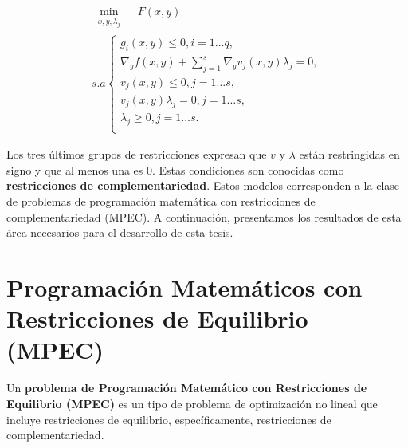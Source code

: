 % 
        \begin{equation}\label{eq:KKT_Optimista}   
            \begin{array}{l}
                \underset{\substack{x, y, \lambda_j}}{\min} \quad F(x, y)\\
                s.a \left\{ 
                \begin{array}{l}
                    g_i(x, y) \leq 0, i=1\ldots q,\\
                    \nabla_{y} f(x, y) + \sum_{j=1}^{s} \nabla_{y} v_j(x, y) \lambda_j = 0, \\
                    v_j(x, y) \leq 0, j=1\ldots s,\\
                    v_j(x, y)\lambda_j = 0, j=1\ldots s, \\
                    \lambda_j \geq 0, j=1\ldots s.\\
                \end{array}\right.
            \end{array}
        \end{equation}
     

Los tres últimos grupos de restricciones expresan que $v$ y $\lambda$ están restringidas en signo y que al menos una es 0. Estas condiciones son conocidas como \textbf{restricciones de complementariedad}. Estos modelos corresponden a la clase de problemas de programación matemática con restricciones de complementariedad (MPEC). A continuación, presentamos los resultados de esta área necesarios para el desarrollo de esta tesis.

\section{Programaci\' on Matemáticos con Restricciones de Equilibrio (MPEC)}
Un \textbf{problema de Programaci\'on Matemático con Restricciones de Equilibrio (MPEC)} es un tipo de  problema de optimizaci\'on no lineal que incluye restricciones de equilibrio, específicamente, restricciones de complementariedad.

